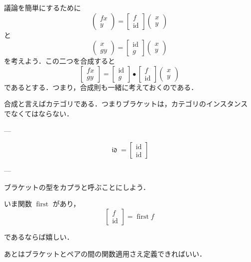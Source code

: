 \documentclass[a5paper,twoside,fleqn,draft]{jsbook}
\newcommand{\mSpecialFunc}[1]{#1}
\newcommand{\mVarSpecialFunc}[1]{\mathfrak{#1}}
\DeclareMathOperator{\mFirst}{\mSpecialFunc{first}}
\DeclareMathOperator{\mId}{\mSpecialFunc{id}}
\DeclareMathOperator{\mIdCat}{\mVarSpecialFunc{id}}
\DeclareMathOperator{\mCompCat}{\bullet}
\newcommand{\mPairWith}[2]{\begin{pmatrix}#1\\#2\end{pmatrix}}
\begin{document}
議論を簡単にするために
\begin{equation}
  \mPairWith{fx}{y}
  =\begin{bmatrix}
  f\\
  \mId
  \end{bmatrix}
  \mPairWith{x}{y}
\end{equation}
と
\begin{equation}
  \mPairWith{x}{gy}
  =\begin{bmatrix}
  \mId\\
  g
  \end{bmatrix}
  \mPairWith{x}{y}
\end{equation}
を考えよう．この二つを合成すると
\begin{equation}
  \begin{bmatrix}
    fx\\
    gy
  \end{bmatrix}
  =
  \begin{bmatrix}
    \mId\\
    g
  \end{bmatrix}
  \mCompCat
  \begin{bmatrix}
    f\\
    \mId
  \end{bmatrix}
  \mPairWith{x}{y}
\end{equation}
であるとする．つまり，合成則も一緒に考えておくのである．

合成と言えばカテゴリである．つまりブラケットは，カテゴリのインスタンス
でなくてはならない．

---

\begin{equation}
  \mIdCat
  =
  \begin{bmatrix}
    \mId\\
    \mId
  \end{bmatrix}
\end{equation}

---

ブラケットの型をカプラと呼ぶことにしよう．

いま関数 $\mFirst$ があり，
\begin{equation}
  \begin{bmatrix}
    f\\
    \mId
  \end{bmatrix}
  =\mFirst f
\end{equation}


であるならば嬉しい．

あとはブラケットとペアの間の関数適用さえ定義できればいい．
\end{document}
